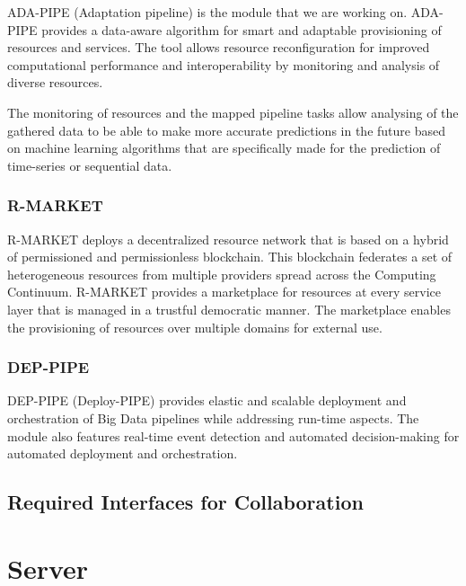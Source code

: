\documentclass{article}
\begin{document}
                    ADA-PIPE (Adaptation pipeline) is the module that we are working on.
                    ADA-PIPE provides a data-aware algorithm for smart and adaptable provisioning of resources and services. The tool allows resource reconfiguration for improved computational performance and interoperability by monitoring and analysis of diverse resources. 
                    
                    The monitoring of resources and the mapped pipeline tasks allow analysing of the gathered data to be able to make more accurate predictions in the future based on machine learning algorithms that are specifically made for the prediction of time-series or sequential data.

                \subsubsection*{R-MARKET}

                    R-MARKET deploys a decentralized resource network that is based on a hybrid of permissioned and permissionless blockchain. This blockchain federates a set of heterogeneous resources from multiple providers spread across the Computing Continuum.
                    R-MARKET provides a marketplace for resources at every service layer that is managed in a trustful democratic manner.
                    The marketplace enables the provisioning of resources over multiple domains for external use.

                \subsubsection*{DEP-PIPE}

                    DEP-PIPE (Deploy-PIPE) provides elastic and scalable deployment and orchestration of Big Data pipelines while addressing run-time aspects.
                    The module also features real-time event detection and automated decision-making for automated deployment and orchestration.

        \subsection{Required Interfaces for Collaboration}
        \label{sec:required-interfaces}

    \section{Server}
\end{document}
